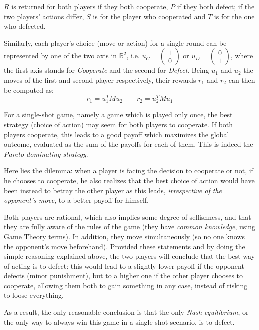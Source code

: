 \documentclass[journal,10pt,twoside]{IEEEtran}
\begin{document}
$R$ is returned for both players if they both cooperate, $P$ if they both defect; if the two players' actions differ, $S$ is for the player who cooperated and $T$ is for the one who defected.

Similarly, each player's choice (move or action) for a single round can be represented by one of the two axis in $\mathbb{R}^2$, i.e. $u_C=\begin{pmatrix} 1 \\ 0 \end{pmatrix}$ or $u_D=\begin{pmatrix} 0 \\ 1 \end{pmatrix}$, where the first axis stands for \textit{Cooperate} and the second for \textit{Defect}. Being $u_1$ and $u_2$ the moves of the first and second player respectively, their rewards $r_1$ and $r_2$ can then be computed as:
$$
r_1 = u_1^T M u_2
\quad
\quad
r_2 = u_2^T M u_1
$$

For a single-shot game, namely a game which is played only once, the best strategy (choice of action) may seem for both players to cooperate. If both players cooperate, this leads to a good payoff which maximizes the global outcome, evaluated as the sum of the payoffs for each of them. This is indeed the \textit{Pareto dominating strategy}.

Here lies the dilemma: when a player is facing the decision to cooperate or not, if he chooses to cooperate, he also realizes that the best choice of action would have been instead to betray the other player as this leads, \textit{irrespective of the opponent's move}, to a better payoff for himself.

Both players are rational, which also implies some degree of selfishness, and that they are fully aware of the rules of the game (they have \textit{common knowledge}, using Game Theory terms). In addition, they move simultaneously (so no one knows the opponent's move beforehand). Provided these statements and by doing the simple reasoning explained above, the two players will conclude that the best way of acting is to defect: this would lead to a slightly lower payoff if the opponent defects (minor punishment), but to a higher one if the other player chooses to cooperate, allowing them both to gain something in any case, instead of risking to loose everything.

As a result, the only reasonable conclusion is that the only \textit{Nash equilibrium}, or the only way to always win this game in a single-shot scenario, is to defect.
\end{document}
